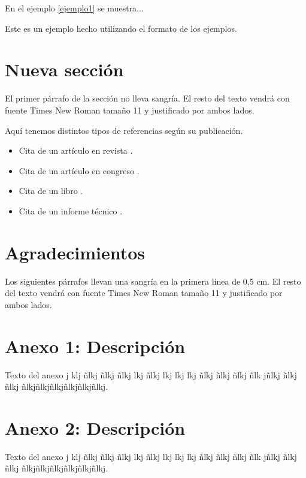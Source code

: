 \documentclass[a4paper,11pt,twocolumn,twoside]{article}
\begin{document}
En el ejemplo \ref{ejemplo1} se muestra...
\begin{example}
Este es un ejemplo hecho utilizando el formato de los ejemplos.
\label{ejemplo1}
\end{example}

\section{Nueva sección}

El primer párrafo de la sección no lleva sangría. El resto del
texto vendrá con fuente Times New Roman tamaño 11 y justificado
por ambos lados.

Aquí tenemos distintos tipos de referencias según su publicación.

\begin{itemize}
\item Cita de un artículo en revista
\cite{Carletta96}.

\item Cita de un artículo en congreso
\cite{Connolly94}.

\item Cita de un libro \cite{Casares94}.

\item Cita de un informe técnico \cite{Ersan94}.
\end{itemize}

\section*{Agradecimientos}

Los siguientes párrafos llevan una sangría en la primera línea de
0,5 cm. El resto del texto vendrá con fuente Times New Roman
tamaño 11 y justificado por ambos lados.





\appendix
\section{Anexo 1: Descripción} Texto del anexo j klj ñlkj ñlkj ñlkj
lkj ñlkj lkj lkj lkj ñlkj ñlkj ñlkj ñlk jñlkj ñlkj ñlkj
ñlkjñlkjñlkjñlkjñlkjñlkj.

\section{Anexo 2: Descripción} Texto del anexo j klj ñlkj ñlkj ñlkj
lkj ñlkj lkj lkj lkj ñlkj ñlkj ñlkj ñlk jñlkj ñlkj ñlkj
ñlkjñlkjñlkjñlkjñlkjñlkj.
\end{document}
